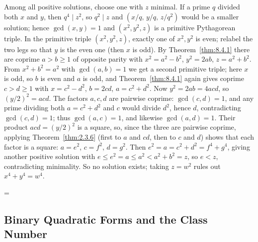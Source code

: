 \documentclass[11pt]{article}
\makeatletter
\theoremstyle{ntstyle}
\let\nt@closedisplay\]
\def\nt@guardedclose{\@ifnextchar\par{\nt@closeafterpar}{\@ifnextchar\end{\postdisplaypenalty\@M\nt@closedisplay}{\nt@closedisplay}}}
\def\nt@closeafterpar\par{\@ifnextchar\par{\nt@closeafterpar}{\@ifnextchar\end{\postdisplaypenalty\@M\nt@closedisplay\par}{\nt@closedisplay\par}}}
\renewenvironment{proof}[1][\proofname]{\par
  \pushQED{\qed}\normalfont\topsep\medskipamount\edef\nt@afterproof{\@endparpenalty=\the\@endparpenalty\relax}\@beginparpenalty\@M\@endparpenalty\@M\let\]\nt@guardedclose\trivlist\item[]\textit{#1\@addpunct{.}} \ignorespaces}{\ifvmode\addpenalty\@M\fi\popQED\nt@afterproof\endtrivlist\@endpefalse}
\makeatother
\begin{document}
\begin{proof} Among all positive solutions, choose one
	with $z$ minimal. If a prime $q$ divided both $x$ and $y$, then $q^{4}\mid
		z^{2}$, so $q^{2}\mid z$ and $(x/q,\,y/q,\,z/q^{2})$ would be a smaller
	solution; hence $\gcd(x, y)=1$ and $(x^{2},y^{2},z)$ is a primitive
	Pythagorean triple. In the primitive triple $(x^{2},y^{2},z)$, exactly one of $x^{2},y^{2}$ is even; relabel the two legs so that $y$ is the even one (then $x$ is odd). By Theorem~\ref{thm:8.4.1} there are coprime $a>b\ge1$ of opposite parity with $x^{2}=a^{2}-b^{2}$, $y^{2}=2ab$, $z=a^{2}+b^{2}$. From $x^{2}+b^{2}=a^{2}$ with $\gcd(a, b)=1$ we get a second
	primitive triple; here $x$ is odd, so $b$ is even and $a$ is odd, and
	Theorem~\ref{thm:8.4.1} again gives coprime $c>d\ge1$ with $x=c^{2}-d^{2}$,
	$b=2cd$, $a=c^{2}+d^{2}$. Now $y^{2}=2ab=4acd$, so $(y/2)^{2}=acd$.
	The factors $a,c,d$ are pairwise coprime: $\gcd(c, d)=1$, and any
	prime dividing both $a=c^{2}+d^{2}$ and $c$ would divide $d^{2}$,
	hence $d$, contradicting $\gcd(c, d)=1$; thus $\gcd(a, c)=1$, and
	likewise $\gcd(a, d)=1$. Their product $acd=(y/2)^{2}$ is a square,
	so, since the three are pairwise coprime, applying Theorem~\ref{thm:2.3.6} (first
	to $a$ and $cd$, then to $c$ and $d$) shows that each factor is a square:
	$a=e^{2}$, $c=f^{2}$, $d=g^{2}$. Then
	$e^{2}=a=c^{2}+d^{2}=f^{4}+g^{4}$, giving another positive solution with
	$e\le e^{2}=a\le a^{2}<a^{2}+b^{2}=z$, so $e<z$, contradicting
	minimality. So no solution exists; taking $z=w^{2}$ rules out
	$x^{4}+y^{4}=w^{4}$.

\end{proof}
\subsection{Binary Quadratic Forms and the Class Number}
\end{document}
